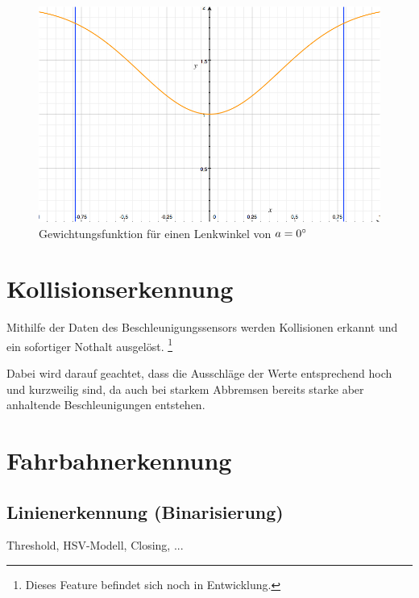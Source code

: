 \documentclass[a4paper,12pt]{report}
\begin{document}
	
	\begin{figure}
		\centering
		\includegraphics[width=\textwidth,height=\textheight,keepaspectratio]{assets/uss-function}
		\caption{Gewichtungsfunktion für einen Lenkwinkel von $a = 0\degree$}
		\label{img_uss_function}
	\end{figure}
	

\chapter{Kollisionserkennung}

	Mithilfe der Daten des Beschleunigungssensors werden Kollisionen erkannt und ein sofortiger Nothalt ausgelöst.
	\footnote{Dieses Feature befindet sich noch in Entwicklung.}
	
	Dabei wird darauf geachtet, dass die Ausschläge der Werte entsprechend hoch und kurzweilig sind, da auch bei starkem Abbremsen bereits starke aber anhaltende Beschleunigungen entstehen.
	

\chapter{Fahrbahnerkennung}

\section{Linienerkennung (Binarisierung)}
	Threshold, HSV-Modell, Closing, ...
	
\end{document}
